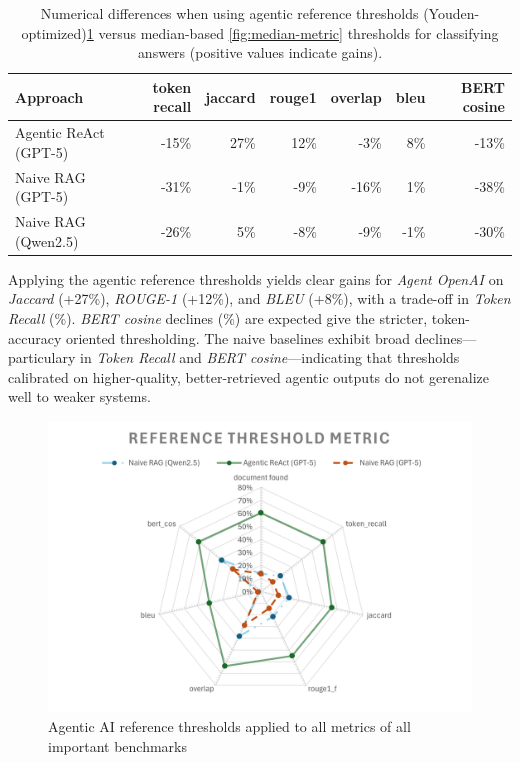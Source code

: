 \begin{table}[htbp]
    \centering
    \begin{tabular}{l r r r  r r r}
        \hline
        Approach &  token recall & jaccard & rouge1 & overlap & bleu & \gls{BERT} cosine \\
        \hline
        Agentic ReAct (\gls{GPT}-5) &  -15\% & 27\% & 12\% & -3\% & 8\% & -13\% \\
        Naive \gls{RAG} (\gls{GPT}-5) &  -31\% & -1\% & -9\% & -16\% & 1\% & -38\% \\
        Naive \gls{RAG} (Qwen2.5) &  -26\% & 5\% & -8\% & -9\% & -1\% & -30\% \\
        \hline
    \end{tabular}
    \caption{Numerical differences when using agentic reference thresholds (Youden-optimized)\ref{fig:Youden-metric} versus median-based \ref{fig:median-metric} thresholds for classifying answers (positive values indicate gains).}
    \label{tab:gain-loss-reference-median}
\end{table}

Applying the agentic reference thresholds yields clear gains for \textit{Agent OpenAI} on \textit{Jaccard} (+27\%), \textit{ROUGE-1} (+12\%), and \textit{BLEU} (+8\%), with a trade-off in \textit{Token Recall} (\%). \textit{\gls{BERT} cosine} declines (\%) are expected give the stricter, token-accuracy oriented thresholding. The naive baselines exhibit broad declines—particulary in \textit{Token Recall} and \textit{\gls{BERT} cosine}—indicating that thresholds calibrated on higher-quality, better-retrieved agentic outputs do not gerenalize well to weaker systems.
\begin{figure}
    \centering
    \includegraphics[width=0.75\linewidth]{Figures/Reference Threshold Metric.png}
    \caption{Agentic AI reference thresholds applied to all metrics of all important benchmarks}\label{fig:Youden-metric}
\end{figure}

